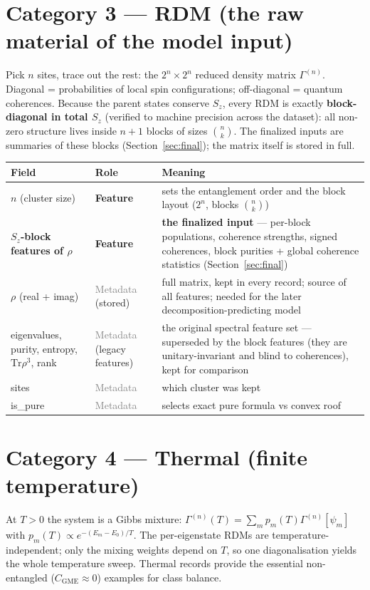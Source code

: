 \documentclass[11pt]{article}
\newcommand{\CGME}{\ensuremath{C_{\mathrm{GME}}}}
\newcommand{\rdm}{\ensuremath{\Gamma^{(n)}}}
\newcommand{\feat}{\textcolor{blue!60!black}{\textbf{Feature}}}
\newcommand{\meta}{\textcolor{gray}{Metadata}}
\begin{document}
\section{Category 3 --- RDM (the raw material of the model input)}
Pick $n$ sites, trace out the rest: the $2^n\times2^n$ reduced density matrix
\rdm. Diagonal = probabilities of local spin configurations; off-diagonal =
quantum coherences. Because the parent states conserve $S_z$, every RDM is
exactly \textbf{block-diagonal in total $S_z$} (verified to machine precision
across the dataset): all non-zero structure lives inside $n{+}1$ blocks of
sizes $\binom{n}{k}$. The finalized inputs are summaries of these blocks
(Section~\ref{sec:final}); the matrix itself is stored in full.

\begin{center}
\begin{tabular}{@{}llp{8.2cm}@{}}
\toprule
Field & Role & Meaning \\ \midrule
$n$ (cluster size)     & \feat{} & sets the entanglement order and the block
                         layout ($2^n$, blocks $\binom{n}{k}$) \\
\textbf{$S_z$-block features of $\rho$} & \feat{} & \textbf{the finalized
  input} --- per-block populations, coherence strengths, signed coherences,
  block purities + global coherence statistics
  (Section~\ref{sec:final}) \\
$\rho$ (real + imag)   & \meta{} (stored) & full matrix, kept in every record;
  source of all features; needed for the later decomposition-predicting
  model \\
eigenvalues, purity, entropy, $\mathrm{Tr}\rho^3$, rank & \meta{}
  (legacy features) & the original spectral feature set --- superseded by the
  block features (they are unitary-invariant and blind to coherences), kept
  for comparison \\
sites                  & \meta{} & which cluster was kept \\
is\_pure               & \meta{} & selects exact pure formula vs convex roof \\
\bottomrule
\end{tabular}
\end{center}

\section{Category 4 --- Thermal (finite temperature)}
At $T>0$ the system is a Gibbs mixture: $\rdm(T)=\sum_m p_m(T)\rdm[\psi_m]$
with $p_m(T)\propto e^{-(E_m-E_0)/T}$. The per-eigenstate RDMs are
temperature-independent; only the mixing weights depend on $T$, so one
diagonalisation yields the whole temperature sweep. Thermal records provide
the essential non-entangled ($\CGME\approx0$) examples for class balance.
\end{document}
